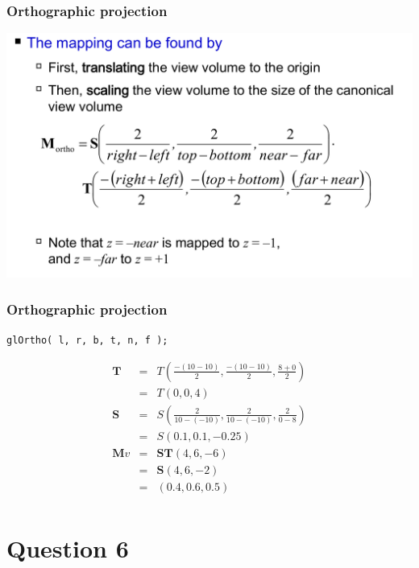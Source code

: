 \documentclass{beamer}
\begin{document}
\begin{frame}
    \frametitle{Orthographic projection}

    \begin{center}
        \includegraphics[scale=0.3]{ortho-proj.png}
    \end{center}

\end{frame}

\begin{frame}
    \frametitle{Orthographic projection}

    \begin{tcolorbox}[colback=violet!5!white]
        \begin{center}
            \texttt{glOrtho( l, r, b, t, n, f );}
        \end{center}
    \end{tcolorbox}

    \begin{eqnarray*}
        \mathbf{T} &=& T(\frac{-(10-10)}{2} , \frac{-(10-10)}{2} , \frac{8+0}{2})\\
        &=& T(0,0,4)\\
        \mathbf{S} &=& S(\frac{2}{10 - (-10)} ,\frac{2}{10 - (-10)}, \frac{2}{0 - 8} )\\
        &=& S(0.1,0.1,-0.25)\\
        \mathbf{M}v &=& \mathbf{ST} (4,6,-6)\\
        &=& \mathbf{S} (4,6,-2)\\
        &=& (0.4,0.6,0.5)\\
    \end{eqnarray*}

\end{frame}

\section{Question 6}
\end{document}
